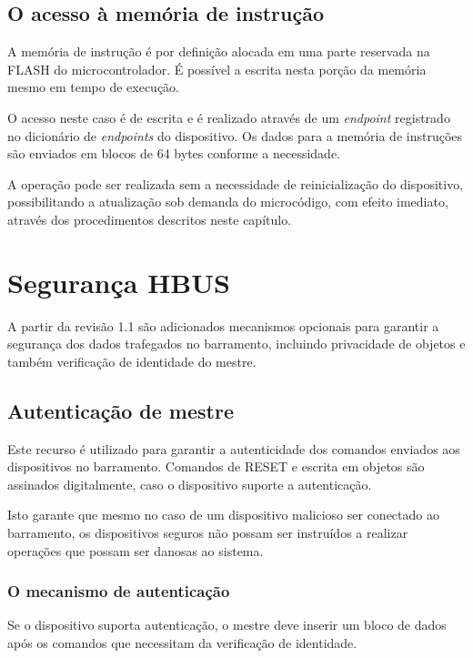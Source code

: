 \documentclass[11pt]{report}
\begin{document}
\section{O acesso à memória de instrução}

A memória de instrução é por definição alocada em uma parte reservada na FLASH do microcontrolador.
É possível a escrita nesta porção da memória mesmo em tempo de execução.

O acesso neste caso é de escrita e é realizado através de um \textit{endpoint} registrado no dicionário de \textit{endpoints} do dispositivo. Os dados para a memória de instruções são enviados em blocos de 64 bytes conforme a necessidade.

A operação pode ser realizada sem a necessidade de reinicialização do dispositivo, possibilitando a atualização sob demanda do microcódigo, com efeito imediato, através dos procedimentos descritos neste capítulo.

\chapter{Segurança HBUS}

A partir da revisão 1.1 são adicionados mecanismos opcionais para garantir a segurança dos dados trafegados no barramento, incluindo privacidade de objetos e também verificação de identidade do mestre.

\section{Autenticação de mestre}

Este recurso é utilizado para garantir a autenticidade dos comandos enviados aos dispositivos no barramento. Comandos de RESET e escrita em objetos são assinados digitalmente, caso o dispositivo suporte a autenticação.

Isto garante que mesmo no caso de um dispositivo malicioso ser conectado ao barramento, os dispositivos seguros não possam ser instruídos a realizar operações que possam ser danosas ao sistema.

\subsection{O mecanismo de autenticação}

Se o dispositivo suporta autenticação, o mestre deve inserir um bloco de dados após os comandos que necessitam da verificação de identidade.
\end{document}
